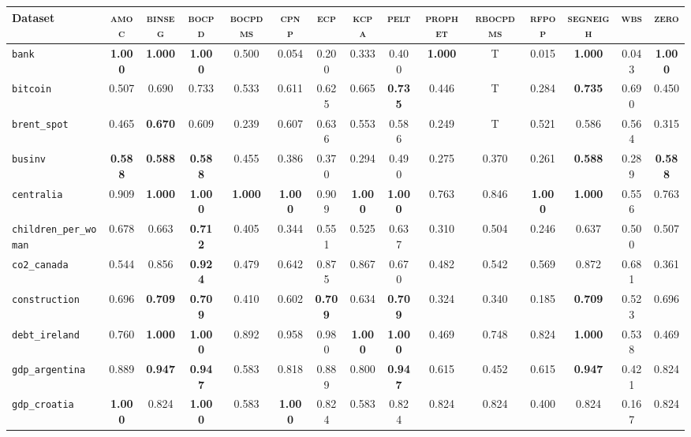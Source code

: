 \begin{tabular}{lcccccccccccccc}
Dataset & \textsc{amoc} & \textsc{binseg} & \textsc{bocpd} & \textsc{bocpdms} & \textsc{cpnp} & \textsc{ecp} & \textsc{kcpa} & \textsc{pelt} & \textsc{prophet} & \textsc{rbocpdms} & \textsc{rfpop} & \textsc{segneigh} & \textsc{wbs} & \textsc{zero}\\
\hline
\verb+bank+ & \textbf{1.000} & \textbf{1.000} & \textbf{1.000} & 0.500 & 0.054 & 0.200 & 0.333 & 0.400 & \textbf{1.000} & T & 0.015 & \textbf{1.000} & 0.043 & \textbf{1.000}\\
\verb+bitcoin+ & 0.507 & 0.690 & 0.733 & 0.533 & 0.611 & 0.625 & 0.665 & \textbf{0.735} & 0.446 & T & 0.284 & \textbf{0.735} & 0.690 & 0.450\\
\verb+brent_spot+ & 0.465 & \textbf{0.670} & 0.609 & 0.239 & 0.607 & 0.636 & 0.553 & 0.586 & 0.249 & T & 0.521 & 0.586 & 0.564 & 0.315\\
\verb+businv+ & \textbf{0.588} & \textbf{0.588} & \textbf{0.588} & 0.455 & 0.386 & 0.370 & 0.294 & 0.490 & 0.275 & 0.370 & 0.261 & \textbf{0.588} & 0.289 & \textbf{0.588}\\
\verb+centralia+ & 0.909 & \textbf{1.000} & \textbf{1.000} & \textbf{1.000} & \textbf{1.000} & 0.909 & \textbf{1.000} & \textbf{1.000} & 0.763 & 0.846 & \textbf{1.000} & \textbf{1.000} & 0.556 & 0.763\\
\verb+children_per_woman+ & 0.678 & 0.663 & \textbf{0.712} & 0.405 & 0.344 & 0.551 & 0.525 & 0.637 & 0.310 & 0.504 & 0.246 & 0.637 & 0.500 & 0.507\\
\verb+co2_canada+ & 0.544 & 0.856 & \textbf{0.924} & 0.479 & 0.642 & 0.875 & 0.867 & 0.670 & 0.482 & 0.542 & 0.569 & 0.872 & 0.681 & 0.361\\
\verb+construction+ & 0.696 & \textbf{0.709} & \textbf{0.709} & 0.410 & 0.602 & \textbf{0.709} & 0.634 & \textbf{0.709} & 0.324 & 0.340 & 0.185 & \textbf{0.709} & 0.523 & 0.696\\
\verb+debt_ireland+ & 0.760 & \textbf{1.000} & \textbf{1.000} & 0.892 & 0.958 & 0.980 & \textbf{1.000} & \textbf{1.000} & 0.469 & 0.748 & 0.824 & \textbf{1.000} & 0.538 & 0.469\\
\verb+gdp_argentina+ & 0.889 & \textbf{0.947} & \textbf{0.947} & 0.583 & 0.818 & 0.889 & 0.800 & \textbf{0.947} & 0.615 & 0.452 & 0.615 & \textbf{0.947} & 0.421 & 0.824\\
\verb+gdp_croatia+ & \textbf{1.000} & 0.824 & \textbf{1.000} & 0.583 & \textbf{1.000} & 0.824 & 0.583 & 0.824 & 0.824 & 0.824 & 0.400 & 0.824 & 0.167 & 0.824\\

\end{tabular}
